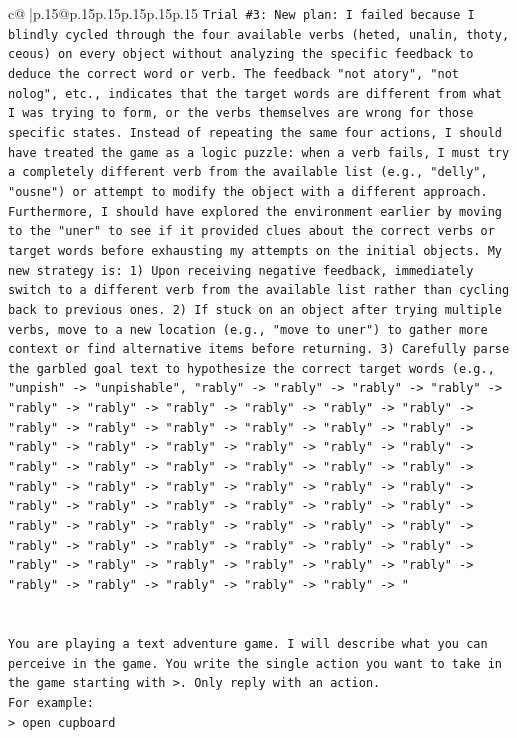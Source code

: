 \documentclass{article}
\begin{document}
{\begin{supertabular}{c@{$\;$}|p{.15\linewidth}@{}p{.15\linewidth}p{.15\linewidth}p{.15\linewidth}p{.15\linewidth}p{.15\linewidth}}
{{{\texttt{Trial \#3: New plan: I failed because I blindly cycled through the four available verbs (heted, unalin, thoty, ceous) on every object without analyzing the specific feedback to deduce the correct word or verb. The feedback "not atory", "not nolog", etc., indicates that the target words are different from what I was trying to form, or the verbs themselves are wrong for those specific states. Instead of repeating the same four actions, I should have treated the game as a logic puzzle: when a verb fails, I must try a completely different verb from the available list (e.g., "delly", "ousne") or attempt to modify the object with a different approach. Furthermore, I should have explored the environment earlier by moving to the "uner" to see if it provided clues about the correct verbs or target words before exhausting my attempts on the initial objects. My new strategy is: 1) Upon receiving negative feedback, immediately switch to a different verb from the available list rather than cycling back to previous ones. 2) If stuck on an object after trying multiple verbs, move to a new location (e.g., "move to uner") to gather more context or find alternative items before returning. 3) Carefully parse the garbled goal text to hypothesize the correct target words (e.g., "unpish" {-}> "unpishable", "rably" {-}> "rably" {-}> "rably" {-}> "rably" {-}> "rably" {-}> "rably" {-}> "rably" {-}> "rably" {-}> "rably" {-}> "rably" {-}> "rably" {-}> "rably" {-}> "rably" {-}> "rably" {-}> "rably" {-}> "rably" {-}> "rably" {-}> "rably" {-}> "rably" {-}> "rably" {-}> "rably" {-}> "rably" {-}> "rably" {-}> "rably" {-}> "rably" {-}> "rably" {-}> "rably" {-}> "rably" {-}> "rably" {-}> "rably" {-}> "rably" {-}> "rably" {-}> "rably" {-}> "rably" {-}> "rably" {-}> "rably" {-}> "rably" {-}> "rably" {-}> "rably" {-}> "rably" {-}> "rably" {-}> "rably" {-}> "rably" {-}> "rably" {-}> "rably" {-}> "rably" {-}> "rably" {-}> "rably" {-}> "rably" {-}> "rably" {-}> "rably" {-}> "rably" {-}> "rably" {-}> "rably" {-}> "rably" {-}> "rably" {-}> "rably" {-}> "rably" {-}> "rably" {-}> "rably" {-}> "rably" {-}> "rably" {-}> "rably" {-}> "} \\
\\ 
\\ 
\texttt{You are playing a text adventure game. I will describe what you can perceive in the game. You write the single action you want to take in the game starting with >. Only reply with an action.} \\
\texttt{For example:} \\
\texttt{> open cupboard} \\
}}}
\end{supertabular}}
\end{document}
